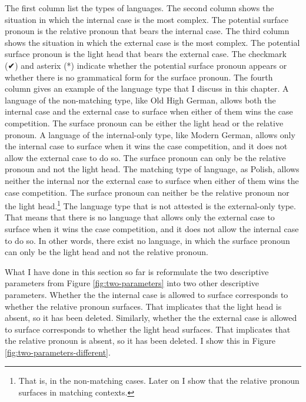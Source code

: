 The first column list the types of languages.
The second column shows the situation in which the internal case is the most complex. The potential surface pronoun is the relative pronoun that bears the internal case.
The third column shows the situation in which the external case is the most complex. The potential surface pronoun is the light head that bears the external case.
The checkmark (✔) and asterix (*) indicate whether the potential surface pronoun appears or whether there is no grammatical form for the surface pronoun.
The fourth column gives an example of the language type that I discuss in this chapter.
A language of the non-matching type, like Old High German, allows both the internal case and the external case to surface when either of them wins the case competition. The surface pronoun can be either the light head or the relative pronoun.
A language of the internal-only type, like Modern German, allows only the internal case to surface when it wins the case competition, and it does not allow the external case to do so. The surface pronoun can only be the relative pronoun and not the light head.
The matching type of language, as Polish, allows neither the internal nor the external case to surface when either of them wins the case competition. The surface pronoun can neither be the relative pronoun nor the light head.\footnote{
That is, in the non-matching cases. Later on I show that the relative pronoun surfaces in matching contexts.
}
The language type that is not attested is the external-only type. That means that there is no language that allows only the external case to surface when it wins the case competition, and it does not allow the internal case to do so. In other words, there exist no language, in which the surface pronoun can only be the light head and not the relative pronoun.

What I have done in this section so far is reformulate the two descriptive parameters from Figure \ref{fig:two-parameters} into two other descriptive parameters.
Whether the the internal case is allowed to surface corresponds to whether the relative pronoun surfaces. That implicates that the light head is absent, so it has been deleted.
Similarly, whether the the external case is allowed to surface corresponds to whether the light head surfaces. That implicates that the relative pronoun is absent, so it has been deleted.
I show this in Figure \ref{fig:two-parameters-different}.

